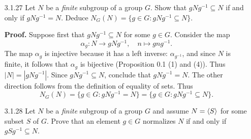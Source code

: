 \begin{enumerate}
\begin{enumerate}
               ($\Rightarrow$) Suppose $N \trianglelefteq G$. Let $g \in G$.
               Then by normality, it follows that $gxg^{-1} \in \cyc{x}$. That
               is, $gxg^{-1} = x^k$ for some integer $k$.
         \item Let $S = \{g \in G : |g| = n\}$ and $N = \cyc{S}$. If $S$ is
               empty, then $N = 1$ is normal in $G$, so suppose
               $S \neq \emptyset$. Let $g \in G$ and $s \in S$. We have that
               $|gsg^{-1}| = |s| = n$ by (a), so that $gsg^{-1} \in S$. Since
               $S \subseteq N$, it follows that $gsg^{-1} \in N$, so that
               $gSg^{-1} \subseteq N$. Conclude from (c) that $N$ is normal in
               $G$.
      \end{enumerate} \qed
   \item[3.1.27]  Let $N$ be a \textit{finite} subgroup of a group $G$. Show
                  that $gNg^{-1} \subseteq N$ if and only if $gNg^{-1} = N$.
                  Deduce $N_G(N) = \{g \in G : gNg^{-1} \subseteq N\}$.

      \textbf{Proof.} Suppose first that $gNg^{-1} \subseteq N$ for some
      $g \in G$. Consider the map
      $$\alpha_g : N \rightarrow gNg^{-1}, \quad n \mapsto gng^{-1}.$$
      The map $\alpha_g$ is injective because it has a left inverse:
      $\alpha_{g^{-1}}$, and since $N$ is finite, it follows that $\alpha_g$ is 
      bijective (Proposition 0.1 (1) and (4)). Thus $|N| = |gNg^{-1}|$. Since 
      $gNg^{-1} \subseteq N$, conclude that $gNg^{-1} = N$. The other direction
      follows from the definition of equality of sets. Thus
      $$N_G(N) = \{g \in G : gNg^{-1} = N\} =
        \{g \in G : gNg^{-1} \subseteq N\}.$$
   \item[3.1.28]  Let $N$ be a \textit{finite} subgroup of a group $G$ and
                  assume $N = \cyc{S}$ for some subset $S$ of $G$. Prove that an
                  element $g \in G$ normalizes $N$ if and only if
                  $gSg^{-1} \subseteq N$.


\end{enumerate}
